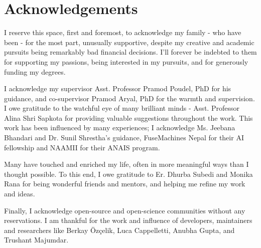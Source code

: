 \chapter*{Acknowledgements}

I reserve this space, first and foremost, to acknowledge my family - who have been - for the most part, unusually supportive, despite my creative and academic pursuits being remarkably bad financial decisions. I'll forever be indebted to them for supporting my passions, being interested in my pursuits, and for generously funding my degrees.

I acknowledge my supervisor Asst. Professor Pramod Poudel, PhD for his guidance, and co-supervisor Pramod Aryal, PhD for the warmth and supervision. I owe gratitude to the watchful eye of many brilliant minds - Asst. Professor Alina Shri Sapkota for providing valuable suggestions throughout the work. This work has been influenced by many experiences; I acknowledge Ms. Jeebana Bhandari and Dr. Sunil Shrestha's guidance, FuseMachines Nepal for their AI fellowship and NAAMII for their ANAIS program.

Many have touched and enriched my life, often in more meaningful ways than I thought possible. To this end, I owe gratitude to Er. Dhurba Subedi and Monika Rana for being wonderful friends and mentors, and helping me refine my work and ideas.

Finally, I acknowledge open-source and open-science communities without any reservations. I am thankful for the work and influence of developers, maintainers and researchers like Berkay Özçelik, Luca Cappelletti, Anubha Gupta, and Trushant Majumdar.